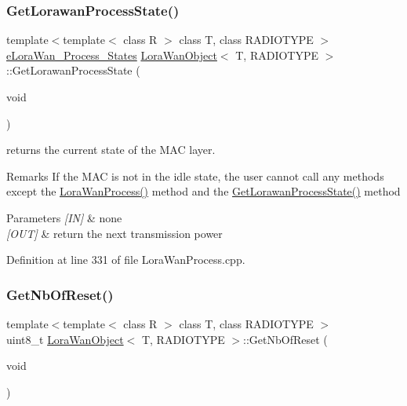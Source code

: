 \subsubsection{\texorpdfstring{Get\+Lorawan\+Process\+State()}{GetLorawanProcessState()}}
{\footnotesize\ttfamily template$<$template$<$ class R $>$ class T, class R\+A\+D\+I\+O\+T\+Y\+PE $>$ \\
\mbox{\hyperlink{_define_8h_acabcd539e4bcc6575c90bd7d857b21f4}{e\+Lora\+Wan\+\_\+\+Process\+\_\+\+States}} \mbox{\hyperlink{class_lora_wan_object}{Lora\+Wan\+Object}}$<$ T, R\+A\+D\+I\+O\+T\+Y\+PE $>$\+::Get\+Lorawan\+Process\+State (\begin{DoxyParamCaption}\item[{void}]{ }\end{DoxyParamCaption})}



returns the current state of the M\+AC layer. 

\begin{DoxyRemark}{Remarks}
If the M\+AC is not in the idle state, the user cannot call any methods except the \mbox{\hyperlink{class_lora_wan_object_aa833aaa609033491d4b8566bc93851cf}{Lora\+Wan\+Process()}} method and the \mbox{\hyperlink{class_lora_wan_object_add21dc9bc142938b0b37f958f6874100}{Get\+Lorawan\+Process\+State()}} method 
\end{DoxyRemark}

\begin{DoxyParams}{Parameters}
{\em \mbox{[}\+I\+N\mbox{]}} & none \\
\hline
{\em \mbox{[}\+O\+U\+T\mbox{]}} & return the next transmission power \\
\hline
\end{DoxyParams}


Definition at line 331 of file Lora\+Wan\+Process.\+cpp.

\mbox{\label{class_lora_wan_object_a3432781cfedda764c71fa2839c54a9bd}} 
\subsubsection{\texorpdfstring{Get\+Nb\+Of\+Reset()}{GetNbOfReset()}}
{\footnotesize\ttfamily template$<$template$<$ class R $>$ class T, class R\+A\+D\+I\+O\+T\+Y\+PE $>$ \\
uint8\+\_\+t \mbox{\hyperlink{class_lora_wan_object}{Lora\+Wan\+Object}}$<$ T, R\+A\+D\+I\+O\+T\+Y\+PE $>$\+::Get\+Nb\+Of\+Reset (\begin{DoxyParamCaption}\item[{void}]{ }\end{DoxyParamCaption})}



